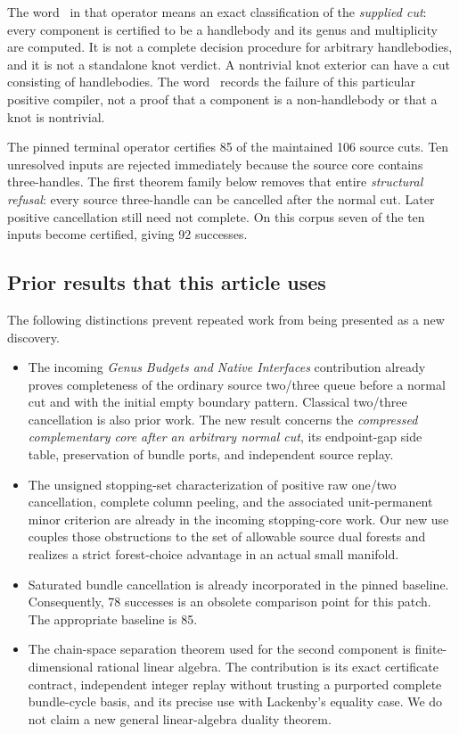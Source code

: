 The word \Complete\ in that operator means an exact classification of the
\emph{supplied cut}: every component is certified to be a handlebody and its
genus and multiplicity are computed. It is not a complete decision procedure
for arbitrary handlebodies, and it is not a standalone knot verdict. A
nontrivial knot exterior can have a cut consisting of handlebodies. The word
\Inconclusive\ records the failure of this particular positive compiler,
not a proof that a component is a non-handlebody or that a knot is nontrivial.

The pinned terminal operator certifies 85 of the maintained 106 source cuts.
Ten unresolved inputs are rejected immediately because the source core
contains three-handles. The first theorem family below removes that entire
\emph{structural refusal}: every source three-handle can be cancelled after
the normal cut. Later positive cancellation still need not complete. On this
corpus seven of the ten inputs become certified, giving 92 successes.

\subsection{Prior results that this article uses}

The following distinctions prevent repeated work from being presented as a
new discovery.

\begin{itemize}
\item The incoming \emph{Genus Budgets and Native Interfaces} contribution
already proves completeness of the ordinary source two/three queue before
a normal cut and with the initial empty boundary pattern. Classical
two/three cancellation is also prior work. The new result concerns the
\emph{compressed complementary core after an arbitrary normal cut}, its
endpoint-gap side table, preservation of bundle ports, and independent
source replay.
\item The unsigned stopping-set characterization of positive raw one/two
cancellation, complete column peeling, and the associated unit-permanent
minor criterion are already in the incoming stopping-core work. Our new
use couples those obstructions to the set of allowable source dual forests
and realizes a strict forest-choice advantage in an actual small manifold.
\item Saturated bundle cancellation is already incorporated in the pinned
baseline. Consequently, 78 successes is an obsolete comparison point for
this patch. The appropriate baseline is 85.
\item The chain-space separation theorem used for the second component is
finite-dimensional rational linear algebra. The contribution is its exact
certificate contract, independent integer replay without trusting a
purported complete bundle-cycle basis, and its precise use with Lackenby's
equality case. We do not claim a new general linear-algebra duality theorem.
\end{itemize}

